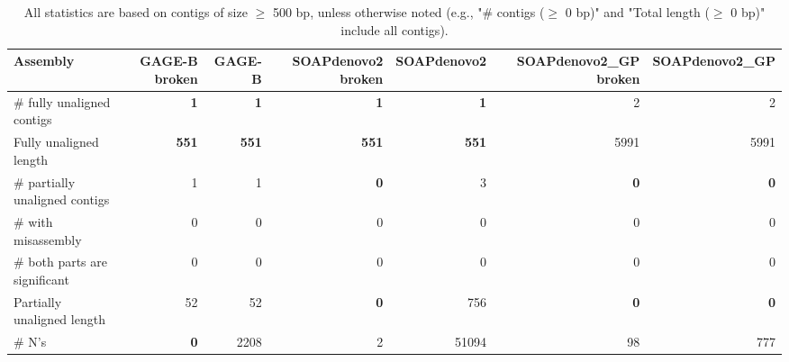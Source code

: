 \documentclass[12pt,a4paper]{article}
\begin{document}
\begin{table}[ht]
\begin{center}
\caption{All statistics are based on contigs of size $\geq$ 500 bp, unless otherwise noted (e.g., "\# contigs ($\geq$ 0 bp)" and "Total length ($\geq$ 0 bp)" include all contigs).}
\begin{tabular}{|l*{6}{|r}|}
\hline
Assembly & GAGE-B broken & GAGE-B & SOAPdenovo2 broken & SOAPdenovo2 & SOAPdenovo2\_GP broken & SOAPdenovo2\_GP \\ \hline
\# fully unaligned contigs & {\bf 1} & {\bf 1} & {\bf 1} & {\bf 1} & 2 & 2 \\ \hline
Fully unaligned length & {\bf 551} & {\bf 551} & {\bf 551} & {\bf 551} & 5991 & 5991 \\ \hline
\# partially unaligned contigs & 1 & 1 & {\bf 0} & 3 & {\bf 0} & {\bf 0} \\ \hline
\hspace{5mm}\# with misassembly & 0 & 0 & 0 & 0 & 0 & 0 \\ \hline
\hspace{5mm}\# both parts are significant & 0 & 0 & 0 & 0 & 0 & 0 \\ \hline
Partially unaligned length & 52 & 52 & {\bf 0} & 756 & {\bf 0} & {\bf 0} \\ \hline
\# N's & {\bf 0} & 2208 & 2 & 51094 & 98 & 777 \\ \hline
\end{tabular}
\end{center}
\end{table}
\end{document}
